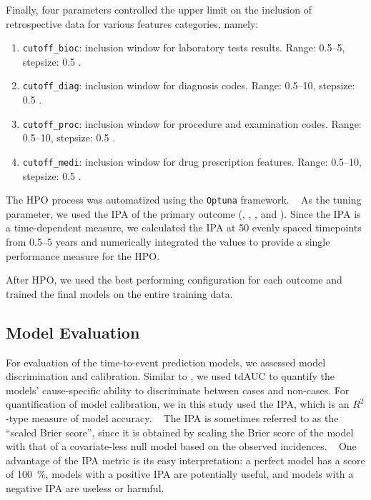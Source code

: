 \begin{fullwidth}
\begin{multicols}{3}
Finally, four parameters controlled the upper limit on the inclusion of 
retrospective data for various features categories, namely:
\begin{enumerate}[label=\alph*), resume]
    \item \verb|cutoff_bioc|: 
        inclusion window for
        laboratory tests results.
        Range: \numrange{0.5}{5},
        stepsize: \num{0.5} .
    \item \verb|cutoff_diag|:
        inclusion window for
        diagnosis codes.
        Range: \numrange{0.5}{10},
        stepsize:  \num{0.5} .
    \item \verb|cutoff_proc|:
        inclusion window for
        procedure and examination codes.
        Range: \numrange{0.5}{10},
        stepsize: \num{0.5} .
    \item \verb|cutoff_medi|:
        inclusion window for
        drug prescription features.
        Range: \numrange{0.5}{10},
        stepsize: \num{0.5} .
\end{enumerate}
    
\end{multicols}
\end{fullwidth}

The \ac{HPO} process was automatized using the \verb|Optuna| framework.
~\autocite{akibaOptuna2019}
As the tuning parameter,
we used the \ac{IPA} of the primary outcome 
(, , , and ).
Since the \ac{IPA} is a time-dependent measure,
we calculated the \ac{IPA} at 50 evenly spaced timepoints from
\numrange{0.5}{5} years and numerically integrated the values
to provide a single performance measure for the \ac{HPO}. 

After \ac{HPO}, 
we used the best performing configuration for each outcome
and trained the final models on the entire training data.

\subsection{Model Evaluation}

For evaluation of the  time-to-event prediction models,
we assessed model discrimination and calibration. 
Similar to \studyii{}, we used \ac{tdAUC} to quantify the models'
cause-specific ability to discriminate between cases and non-cases.
For quantification of model calibration,
we in this study used the \ac{IPA}, 
which is an \(R^{2}\)-type measure of model accuracy.
~\autocite{kattanIndex2018}
The \ac{IPA} is sometimes referred to as the \enquote{scaled Brier score},
since it is obtained by  scaling the Brier score 
of the model with that of a covariate-less null model 
based on the observed incidences.
~\autocite{kattanIndex2018}
One advantage of the \ac{IPA} metric is its easy interpretation:
a perfect model has a score of \qty{100}{\percent},
models with a positive \ac{IPA} are potentially useful,
and models with a negative \ac{IPA} are useless or harmful.


